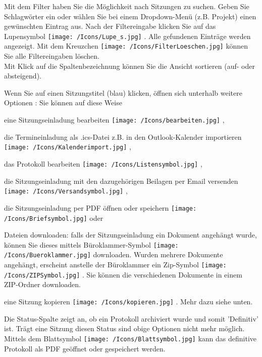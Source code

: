Mit dem Filter haben Sie die Möglichkeit nach Sitzungen zu suchen. Geben Sie Schlagwörter ein oder wählen Sie bei einem Dropdown-Menü (z.B. Projekt) einen gewünschten Eintrag aus. Nach der Filtereingabe klicken Sie auf das Lupensymbol \texttt{[image: /Icons/Lupe\_s.jpg]} . Alle gefundenen Einträge werden angezeigt. Mit dem Kreuzchen \texttt{[image: /Icons/FilterLoeschen.jpg]}  können Sie alle Filtereingaben löschen. \\
Mit Klick auf die Spaltenbezeichnung können Sie die Ansicht sortieren (auf- oder absteigend).

Wenn Sie auf einen Sitzungstitel (blau) klicken, öffnen sich unterhalb weitere Optionen : Sie können auf diese Weise

\begin{compactitem}
	\item eine Sitzungseinladung bearbeiten \texttt{[image: /Icons/bearbeiten.jpg]} ,
	\item die Termineinladung als .ics-Datei z.B. in den Outlook-Kalender importieren \texttt{[image: /Icons/Kalenderimport.jpg]} ,
	\item das Protokoll bearbeiten \texttt{[image: /Icons/Listensymbol.jpg]} ,
	\item die Sitzungseinladung mit den dazugehörigen Beilagen per Email versenden \texttt{[image: /Icons/Versandsymbol.jpg]} ,
	\item die Sitzungseinladung per PDF öffnen oder speichern \texttt{[image: /Icons/Briefsymbol.jpg]}  oder
	\item Dateien downloaden: falls der Sitzungseinladung ein Dokument angehängt wurde, können Sie dieses mittels Büroklammer-Symbol \texttt{[image: /Icons/Bueroklammer.jpg]}  downloaden. Wurden mehrere Dokumente angehängt, erscheint anstelle der Büroklammer ein Zip-Symbol \texttt{[image: /Icons/ZIPSymbol.jpg]} . Sie können die verschiedenen Dokumente in einem ZIP-Ordner downloaden.
	\item eine Sitzung kopieren \texttt{[image: /Icons/kopieren.jpg]} . Mehr dazu siehe unten.
	\end{compactitem}
	
Die Status-Spalte  zeigt an, ob ein Protokoll archiviert wurde und somit 'Definitiv' ist. Trägt eine Sitzung diesen Status sind obige Optionen nicht mehr möglich. Mittels dem Blattsymbol \texttt{[image: /Icons/Blattsymbol.jpg]} kann das definitive Protokoll als PDF geöffnet oder gespeichert werden.
	
